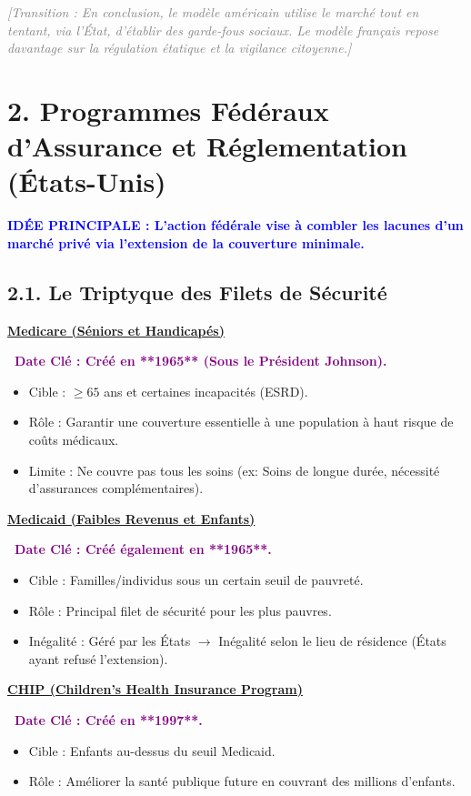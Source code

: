 \documentclass[10pt, a4paper]{article}
\newcommand{\IdeeP}[1]{\noindent\textbf{\textcolor{blue}{IDÉE PRINCIPALE : #1}}\par}
\newcommand{\SousAxe}[1]{\vspace{0.5em}\noindent\underline{\textbf{#1}}\par}
\newcommand{\Transition}[1]{\vspace{1em}\noindent\textit{\textcolor{gray}{[Transition : #1]}}\par}
\newcommand{\DateCle}[1]{\noindent\textbf{\textcolor{purple}{\textbullet\ Date Clé : #1}}\par}
\begin{document}
\Transition{En conclusion, le modèle américain utilise le marché tout en tentant, via l'État, d'établir des garde-fous sociaux. Le modèle français repose davantage sur la régulation étatique et la vigilance citoyenne.}



\section*{2. Programmes Fédéraux d'Assurance et Réglementation (États-Unis)}

\IdeeP{L'action fédérale vise à combler les lacunes d'un marché privé via l'extension de la couverture minimale.}

\subsection*{2.1. Le Triptyque des Filets de Sécurité}

\SousAxe{Medicare (Séniors et Handicapés)}
\DateCle{Créé en **1965** (Sous le Président Johnson).}
\begin{itemize}
\item Cible : $\ge 65$ ans et certaines incapacités (ESRD).
\item Rôle : Garantir une couverture essentielle à une population à haut risque de coûts médicaux.
\item Limite : Ne couvre pas tous les soins (ex: Soins de longue durée, nécessité d'assurances complémentaires).
\end{itemize}

\SousAxe{Medicaid (Faibles Revenus et Enfants)}
\DateCle{Créé également en **1965**.}
\begin{itemize}
\item Cible : Familles/individus sous un certain seuil de pauvreté.
\item Rôle : Principal filet de sécurité pour les plus pauvres.
\item Inégalité : Géré par les États $\to$ Inégalité selon le lieu de résidence (États ayant refusé l'extension).
\end{itemize}

\SousAxe{CHIP (Children's Health Insurance Program)}
\DateCle{Créé en **1997**.}
\begin{itemize}
\item Cible : Enfants au-dessus du seuil Medicaid.
\item Rôle : Améliorer la santé publique future en couvrant des millions d'enfants.
\end{itemize}
\end{document}
